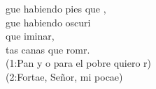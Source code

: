 \begin{cancion}%
	gue habiendo  pies que ,\\
	gue habiendo oscuri\\
	que iminar,\\
	tas canas que romr.\\
	(1:Pan y o para el pobre quiero r)\\
	(2:Fortae, Señor, mi pocae)\\
\end{cancion}%
